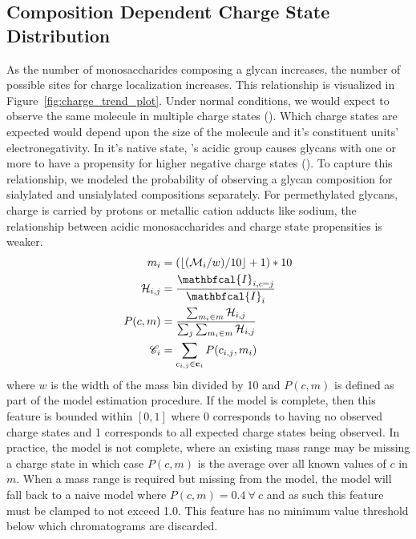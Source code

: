     \subsection{Composition Dependent Charge State Distribution}
        As the number of monosaccharides composing a glycan increases, the number of possible sites
        for charge localization increases. This relationship is visualized in Figure~\ref{fig:charge_trend_plot}.
        Under normal conditions, we would expect to observe the same molecule in multiple charge states
        (\cite{Maxwell2012}). Which charge states are expected would depend upon the size of the molecule
        and it's constituent units' electronegativity. In it's native state, 's
        acidic group causes glycans with one or more  to have a propensity for
        higher negative charge states (\cite{Varki2009}). To capture this relationship, we modeled the
        probability of observing a glycan composition for sialylated and unsialylated compositions
        separately. For permethylated glycans, charge is carried by protons or metallic cation adducts
        like sodium, the relationship between acidic monosaccharides and charge state propensities is
        weaker.
        \begin{align}
            m_i &= (\floor*{(\mathcal{M}_i / w) / 10} + 1) * 10 \nonumber\\
            \mathcal{H}_{i,j} &= \frac{
                \mathbfcal{I}_{i, c=j}}{\mathbfcal{I}_i} \nonumber\\
            P(c, m) &= \frac{\sum_{m_i \in m} \mathcal{H}_{i, j}}{
                \sum_{j}{\sum_{m_i \in m} \mathcal{H}_{i, j}}} \nonumber\\
            \mathscr{C}_i &= \sum_{c_{i, j} \in \mathbf{c}_i}{P(c_{i, j}, m_i)}
        \end{align}
        where $w$ is the width of the mass bin divided by 10 and $P(c, m)$ is defined as
        part of the model estimation procedure. If the model is complete, then this feature is
        bounded within $[0, 1]$ where 0 corresponds to having no observed charge states and 1
        corresponds to all expected charge states being observed. In practice, the model is not
        complete, where an existing mass range may be missing a charge state in which case
        $P(c, m)$ is the average over all known values of $c$ in $m$. When a mass range is
        required but missing from the model, the model will fall back to a naive model where
        $P(c, m) = 0.4 \ \forall \ c$ and as such this feature must be clamped to not exceed
        1.0. This feature has no minimum value threshold below which chromatograms are discarded.

